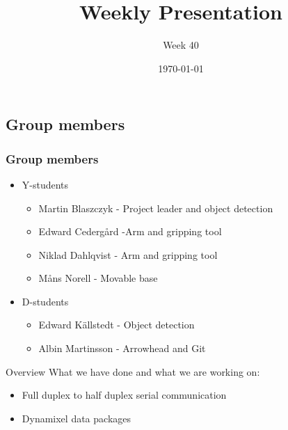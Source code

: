 \documentclass{beamer}
\title{Weekly Presentation}
\subtitle{Week 40}
\author{}
\institute{Luleå University of Technology}
\date{\today}
\begin{document}
\begin{frame}
    \titlepage
\end{frame}




\begin{frame}
    \subsection{Group members}
    \frametitle{Group members }
    \begin{itemize}
        \item Y-students
        \begin{itemize}
            \item Martin Blaszczyk - Project leader and object detection
            \item Edward Cedergård -Arm and gripping tool
            \item Niklad Dahlqvist -  Arm and gripping tool
            \item Måns Norell - Movable base
        \end{itemize}
        \item D-students
        \begin{itemize}
            \item Edward Källstedt - Object detection
            \item Albin Martinsson - Arrowhead and Git
        \end{itemize}  
    \end{itemize}
\end{frame}




\begin{frame}{Overview}
What we have done and what we are working on:
    \begin{itemize}
        \item Full duplex to half duplex serial communication
        \item Dynamixel data packages
    \end{itemize}
\end{frame}






\end{document}
